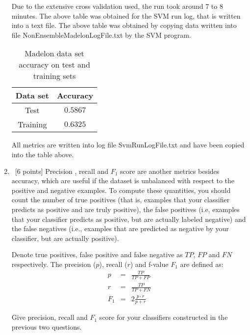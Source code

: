 \begin{enumerate}
Due to the extensive cross validation used, the run took around 7 to 8 minutes. The above table was obtained for the SVM run log, that is written into a text file. The above table was obtained by copying data written into file NonEnsembleMadelonLogFile.txt by the SVM program.

    \begin{table}[H]
    \centering
    \begin{tabular}{| c | c |}
      \hline
      Data set & Accuracy  \\
      \hline
      Test & $0.5867$\\
      \hline
      Training & $0.6325$\\
      \hline
    \end{tabular}
    \caption{Madelon data set accuracy on test and training sets}
  \end{table}   

All metrics are written into log file SvmRunLogFile.txt and have been copied into the table above.

\item ~[6 points] Precision , recall and $ F_1$ score are another
  metrics besides accuracy, which are useful if the dataset is
  unbalanced with respect to the positive and negative examples. To
  compute these quantities, you should count the number of true
  positives (that is, examples that your classifier predicts as
  positive and are truly positive), the false positives (i.e, examples
  that your classifier predicts as positive, but are actually labeled
  negative) and the false negatives (i.e., examples that are predicted
  as negative by your classifier, but are actually positive).
  
  Denote true positives, false positive and false negative as $TP$, $FP$
  and $FN$ respectively. The precision ($p$), recall ($r$) and f-value
  $F_1$ are defined as:
  \begin{eqnarray*}
    p   & = & \frac{TP}{TP + FP} \\
    r   & = & \frac{TP}{TP+FN}   \\
    F_1 & = & 2 \frac{p \cdot r}{p + r} 
  \end{eqnarray*}

  Give precision, recall and $F_1$ score for your classifiers
  constructed in the previous two questions.


\end{enumerate}
